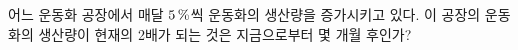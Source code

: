 어느 운동화 공장에서 매달 $5\mkern3mu \%$씩 운동화의 생산량을 증가시키고 있다. 이 공장의 운동화의 생산량이 현재의 2배가 되는 것은 지금으로부터 몇 개월 후인가? 
